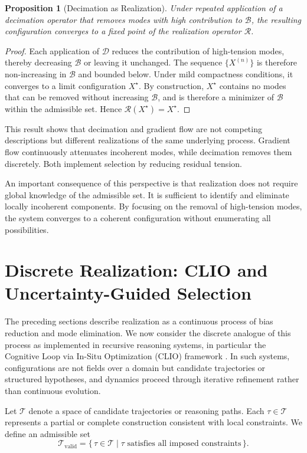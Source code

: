 \documentclass[11pt]{article}
\theoremstyle{plain}
\newtheorem{proposition}[theorem]{Proposition}
\theoremstyle{definition}
\theoremstyle{remark}
\begin{document}
\begin{proposition}[Decimation as Realization]
Under repeated application of a decimation operator that removes modes with high contribution to $\mathcal{B}$, the resulting configuration converges to a fixed point of the realization operator $\mathcal{R}$.
\end{proposition}

\begin{proof}
Each application of $\mathcal{D}$ reduces the contribution of high-tension modes, thereby decreasing $\mathcal{B}$ or leaving it unchanged. The sequence $\{X^{(n)}\}$ is therefore non-increasing in $\mathcal{B}$ and bounded below. Under mild compactness conditions, it converges to a limit configuration $X^\star$. By construction, $X^\star$ contains no modes that can be removed without increasing $\mathcal{B}$, and is therefore a minimizer of $\mathcal{B}$ within the admissible set. Hence $\mathcal{R}(X^\star) = X^\star$.
\end{proof}

This result shows that decimation and gradient flow are not competing descriptions but different realizations of the same underlying process. Gradient flow continuously attenuates incoherent modes, while decimation removes them discretely. Both implement selection by reducing residual tension.

An important consequence of this perspective is that realization does not require global knowledge of the admissible set. It is sufficient to identify and eliminate locally incoherent components. By focusing on the removal of high-tension modes, the system converges to a coherent configuration without enumerating all possibilities.

\section{Discrete Realization: CLIO and Uncertainty-Guided Selection}

The preceding sections describe realization as a continuous process of bias reduction and mode elimination. We now consider the discrete analogue of this process as implemented in recursive reasoning systems, in particular the Cognitive Loop via In-Situ Optimization (CLIO) framework \cite{Cheng2025}. In such systems, configurations are not fields over a domain but candidate trajectories or structured hypotheses, and dynamics proceed through iterative refinement rather than continuous evolution.

Let $\mathcal{T}$ denote a space of candidate trajectories or reasoning paths. Each $\tau \in \mathcal{T}$ represents a partial or complete construction consistent with local constraints. We define an admissible set
\[
\mathcal{T}_{\mathrm{valid}} = \{\, \tau \in \mathcal{T} \mid \tau \text{ satisfies all imposed constraints} \,\}.
\]
\end{document}
